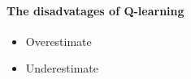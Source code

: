 \documentclass[12pt,a4paper]{article}
\begin{document}
\paragraph{The disadvatages of Q-learning}
\begin{itemize}
\item Overestimate
\item Underestimate 
\end{itemize}



\end{document}
